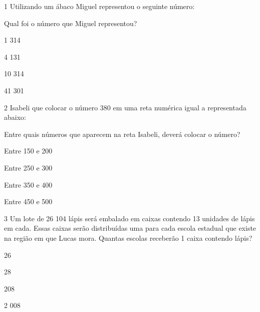 \num{1} Utilizando um ábaco Miguel representou o seguinte número:


Qual foi o número que Miguel representou?

\begin{escolha}
\item
  1 314
\item
  4 131
\item
  10 314
\item
  41 301
\end{escolha}


\num{2} Isabeli que colocar o número 380 em uma reta numérica igual a
representada abaixo:


Entre quais números que aparecem na reta Isabeli, deverá colocar o
número?

\begin{escolha}
\item
  Entre 150 e 200
\item
  Entre 250 e 300
\item
  Entre 350 e 400
\item
  Entre 450 e 500
\end{escolha}


\num{3} Um lote de 26 104 lápis será embalado em caixas contendo 13
unidades de lápis em cada. Essas caixas serão distribuídas uma para cada
escola estadual que existe na região em que Lucas mora. Quantas escolas
receberão 1 caixa contendo lápis?

\begin{escolha}
\item
  26
\item
  28
\item
  208
\item
  2 008
\end{escolha}

